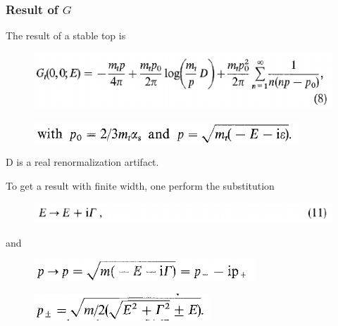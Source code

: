 \documentclass[8pt,dvipsnames,table]{beamer}
\begin{document}
\begin{frame}
	\frametitle{Result of $G$}

	The result of a stable top is
	\begin{figure}[!htb]
		\centering
		\includegraphics[width=.8\linewidth]{image11.png}
		\label{fig:image11}
	\end{figure}
	\begin{figure}[!htb]
		\centering
		\includegraphics[width=.5\linewidth]{image12.png}
		\label{fig:image12}
	\end{figure}
	D is a real renormalization artifact.

	To get a result with finite width, one perform the substitution
	\begin{figure}[!htb]
		\centering
		\includegraphics[width=.8\linewidth]{image13.png}
		\label{fig:image13}
	\end{figure}
	and
	\begin{figure}[!htb]
		\centering
		\includegraphics[width=.5\linewidth]{image14.png}
		\label{fig:image14}
	\end{figure}
	\begin{figure}[!htb]
		\centering
		\includegraphics[width=.4\linewidth]{image10.png}
		\label{fig:image10}
	\end{figure}


\end{frame}
\end{document}

